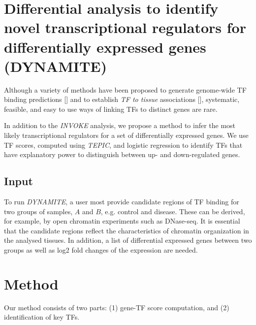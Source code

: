 \documentclass{article}
\begin{document}
\newpage
\section{Differential analysis to identify novel transcriptional regulators for differentially expressed genes (DYNAMITE)}
Although a variety of methods have been proposed to generate genome-wide TF binding predictions [\cite{pmid27899623,pmid22072382,pmid23424114,pmid25086003}] and to establish \textit{TF to tissue} 
associations [\cite{pmid22955983,pmid19995984,pmid27899623}], systematic, feasible, and easy to use ways of linking TFs to distinct genes are rare. 

In addition to the \textit{INVOKE} analysis, we propose a method to infer the most likely transcriptional regulators for a set of differentially expressed genes. 
We use TF scores, computed using \textit{TEPIC}, and logistic regression to identify TFs that have explanatory power to distinguish between up- and down-regulated genes. 

\subsection{Input}
To run \textit{DYNAMITE}, a user most provide candidate regions of TF binding for two groups of samples, $A$ and $B$, e.g. control and disease. 
These can be derived, for example, by open chromatin experiments such as DNase-seq. 
It is essential that the candidate regions reflect the characteristics of chromatin organization in the analysed tissues. 
In addition, a list of differential expressed genes between two groups as well as log2 fold changes of the expression are needed. 

\section*{Method}
Our method consists of two parts: (1) gene-TF score computation, and (2) identification of key TFs. 
\end{document}
